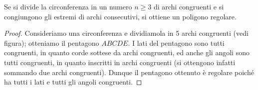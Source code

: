 \begin{inaccessibleblock}
 \begin{figure}[!htb]
	\begin{center}
		\begin{minipage}{0.45\textwidth}
			\centering
			
		\end{minipage}
		\hspace{0.03\textwidth}	
		\begin{minipage}{0.45\textwidth}
			\centering
			
		\end{minipage}
	\end{center}
\end{figure}
\end{inaccessibleblock}

\begin{inaccessibleblock}
 \begin{figure}[!htb]
	\begin{center}
		\begin{minipage}{0.45\textwidth}
			\centering
			
		\end{minipage}
		\hspace{0.03\textwidth}	
		\begin{minipage}{0.45\textwidth}
			\centering
			
		\end{minipage}
	\end{center}
\end{figure}
\end{inaccessibleblock}


\begin{teorema}
Se si divide la circonferenza in un numero \(n\geq 3\) di archi 
congruenti e si congiungono gli estremi di archi consecutivi, si 
ottiene un poligono regolare.
\end{teorema}


\begin{inaccessibleblock}
 \begin{figure}[!htb]
	\centering
\end{figure}
\end{inaccessibleblock}

\begin{proof}
Consideriamo una circonferenza e dividiamola in 5 archi congruenti 
(vedi figura); otteniamo il pentagono \(ABCDE\).
I lati del pentagono sono tutti congruenti, in quanto corde sottese 
da archi congruenti, ed anche gli angoli sono tutti congruenti, in 
quanto inscritti in archi congruenti (si ottengono infatti sommando 
due archi congruenti).
Dunque il pentagono ottenuto è regolare poiché ha tutti i lati e 
tutti gli angoli congruenti.
\end{proof}

